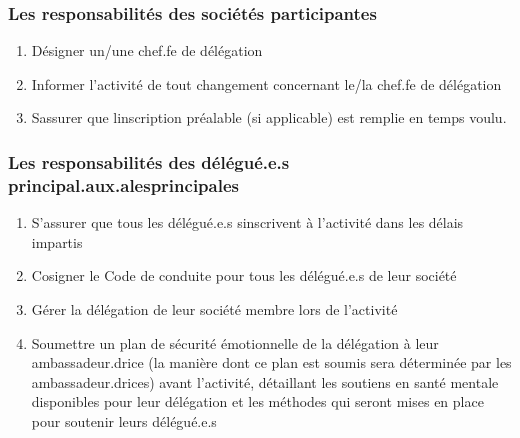\subsubsection{Les responsabilités des sociétés participantes}
\label{les-responsabilites-des-societes-participantes}

\begin{enumerate}
 \item
  Désigner un/une chef.fe de délégation
 \item
  Informer l'activité de tout changement concernant le/la chef.fe de délégation
 \item
  S\textquotesingle assurer que l\textquotesingle inscription préalable (si applicable) est remplie en temps voulu.
\end{enumerate}

\subsubsection{Les responsabilités des délégué.e.s principal.aux.alesprincipales}
\label{les-responsabilites-des-delegue-e-s-principal-aux-alesprincipales}

\begin{enumerate}
 \item
  S'assurer que tous les délégué.e.s s\textquotesingle inscrivent à l'activité dans les délais impartis
 \item
  Cosigner le Code de conduite pour tous les délégué.e.s de leur société
 \item
  Gérer la délégation de leur société membre lors de l'activité
 \item
  Soumettre un plan de sécurité émotionnelle de la délégation à leur ambassadeur.drice (la manière dont ce plan est soumis sera déterminée par les ambassadeur.drices) avant l'activité, détaillant les soutiens en santé mentale disponibles pour leur délégation et les méthodes qui seront mises en place pour soutenir leurs délégué.e.s
\end{enumerate}

